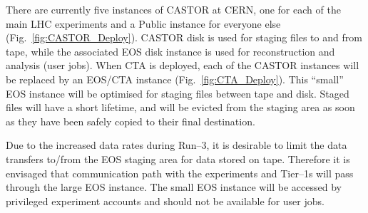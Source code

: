 \documentclass{webofc}
\begin{document}
There are currently five instances of CASTOR at CERN, one for each of the main LHC experiments and a Public instance for
everyone else (Fig.~\ref{fig:CASTOR_Deploy}). CASTOR disk is used for staging files to and from tape, while the associated EOS
disk instance is used for reconstruction and analysis (user jobs). When CTA is deployed, each of the CASTOR instances will be replaced
by an EOS/CTA instance (Fig.~\ref{fig:CTA_Deploy}). This ``small'' EOS instance will be optimised for staging files between tape
and disk. Staged files will have a short lifetime, and will be evicted from the staging area as soon as they have been safely
copied to their final destination.

Due to the increased data rates during Run--3, it is desirable to limit the data transfers to\slash from the EOS staging area for data
stored on tape. Therefore it is envisaged that communication path with the experiments and Tier--1s will pass through the large EOS
instance. The small EOS instance will be accessed by privileged experiment accounts and should not be available for user jobs.
\end{document}
